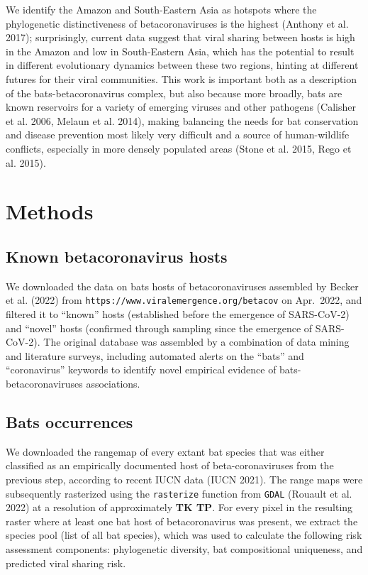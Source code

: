 \documentclass[11pt]{article}
\begin{document}
We identify the Amazon and South-Eastern Asia as hotspots where the
phylogenetic distinctiveness of betacoronaviruses is the highest
(Anthony et al. 2017); surprisingly, current data suggest that viral
sharing between hosts is high in the Amazon and low in South-Eastern
Asia, which has the potential to result in different evolutionary
dynamics between these two regions, hinting at different futures for
their viral communities. This work is important both as a description of
the bats-betacoronavirus complex, but also because more broadly, bats
are known reservoirs for a variety of emerging viruses and other
pathogens (Calisher et al. 2006, Melaun et al. 2014), making balancing
the needs for bat conservation and disease prevention most likely very
difficult and a source of human-wildlife conflicts, especially in more
densely populated areas (Stone et al. 2015, Rego et al. 2015).

\hypertarget{methods}{%
\section{Methods}\label{methods}}

\hypertarget{known-betacoronavirus-hosts}{%
\subsection{Known betacoronavirus
hosts}\label{known-betacoronavirus-hosts}}

We downloaded the data on bats hosts of betacoronaviruses assembled by
Becker et al. (2022) from
\texttt{https://www.viralemergence.org/betacov} on Apr.~2022, and
filtered it to ``known'' hosts (established before the emergence of
SARS-CoV-2) and ``novel'' hosts (confirmed through sampling since the
emergence of SARS-CoV-2). The original database was assembled by a
combination of data mining and literature surveys, including automated
alerts on the ``bats'' and ``coronavirus'' keywords to identify novel
empirical evidence of bats-betacoronaviruses associations.

\hypertarget{bats-occurrences}{%
\subsection{Bats occurrences}\label{bats-occurrences}}

We downloaded the rangemap of every extant bat species that was either
classified as an empirically documented host of beta-coronaviruses from
the previous step, according to recent IUCN data (IUCN 2021). The range
maps were subsequently rasterized using the \texttt{rasterize} function
from \texttt{GDAL} (Rouault et al. 2022) at a resolution of
approximately \textbf{TK TP}. For every pixel in the resulting raster
where at least one bat host of betacoronavirus was present, we extract
the species pool (list of all bat species), which was used to calculate
the following risk assessment components: phylogenetic diversity, bat
compositional uniqueness, and predicted viral sharing risk.
\end{document}
